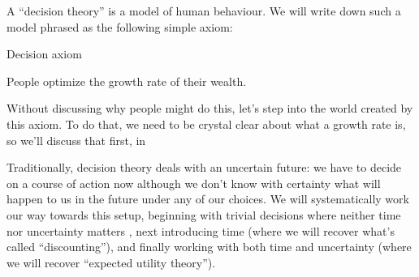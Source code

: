 A ``decision theory'' is a model of human behaviour. We will write down such a model phrased as the following simple 
axiom: 

\begin{keypts}{Decision axiom}

People optimize the growth rate of their wealth.

\end{keypts}

Without discussing why people might do this, let's step into the world created by this axiom. To do that, we need to be crystal clear about what a growth rate is, so we'll discuss that first, in 

Traditionally, decision theory deals with an uncertain future: we have to decide on
a course of action now although we don't know with certainty what will happen to us in the future under any
of our choices. We will systematically work our way towards this setup, beginning with trivial decisions where neither time nor uncertainty matters , next introducing time  (where we will recover what's called ``discounting''), and finally working with both time and uncertainty  (where we will recover ``expected utility theory'').

